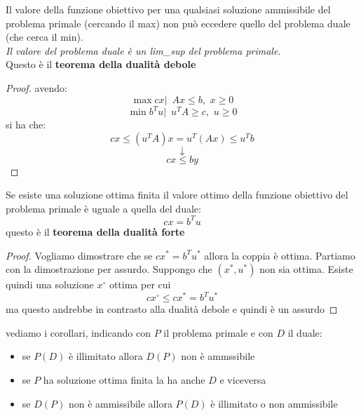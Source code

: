 \message{ !name(ro.tex)}\documentclass[a4paper,12pt, oneside]{book}
\begin{document}
\begin{teorema}
  Il valore della funzione obiettivo per una qualsiasi soluzione
  ammissibile del problema primale (cercando il max) non può eccedere
  quello del problema duale (che cerca il min).\\
  \textit{Il valore del problema duale è un \textit{lim\_sup} del
    problema primale}.\\
  Questo è il \textbf{teorema della dualità debole}
\end{teorema}
\begin{proof}
  avendo:
  \[\max cx|\,\,\, Ax\leq b,\,\,x\geq 0\]
  \[\min b^Tu|\,\,\,u^TA\geq c,\,\,u\geq 0\]
  si ha che:
  \[cx\leq (u^TA)x=u^T(Ax)\leq u^Tb\]
  \[\downarrow\]
  \[cx\leq by\]
\end{proof}
\begin{teorema}
  Se esiste una soluzione ottima finita il valore ottimo della
  funzione obiettivo del problema primale è uguale a quella del duale:
  \[cx=b^Tu\]
  questo è il \textbf{teorema della dualità forte}
\end{teorema}
\begin{proof}
  Vogliamo dimostrare che se $cx^*=b^Tu^*$ allora la coppia è
  ottima. Partiamo con la dimostrazione per assurdo. Suppongo che
  $(x^*,u^*)$ non sia ottima. Esiste quindi una soluzione $x^\circ$
  ottima per cui
  \[cx^\circ \leq cx^*=b^Tu^*\]
  ma questo andrebbe in contrasto alla dualità debole e quindi è un
  assurdo
\end{proof}
vediamo i corollari, indicando con $P$ il problema primale e con $D$
il duale:
\begin{itemize}
  \item se $P(D)$ è illimitato allora $D(P)$ non è ammssibile
  \item se $P$ ha soluzione ottima finita la ha anche $D$ e viceversa
  \item se $D(P)$ non è ammissibile allora $P(D)$ è illimitato o non
  ammissibile 
\end{itemize}
\end{document}
